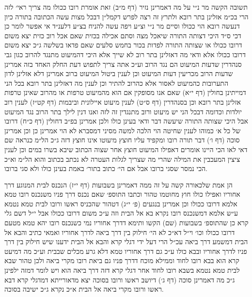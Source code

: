 \documentclass[12pt, openany]{book}
\begin{document}
\begin{multicols}{2}
תשובה הקשה מר נ״י על מה דאמרינן נזיר (דף מ״ב) זאת אומרת רובו ככולו מה צריך ראי׳ לזה הרי בכ״מ אזלינן בתר רובא ולתרץ זה רצה לפרש דקמל״ן דבכל מצות עשה הכתובה בתורה כיון דנעשה רובא הוי ככולו וסיים מר נ״י וצ״ע ויפה עשה להניח בצ״ע דלענ״ד אי אפשר לומר כן דכי ס״ד היכי דצותה התורה שיאכל מצה וסתם אכילה בכזית שאם אכל רוב כזית יצא משום דרובו ככולו או שצותה התורה לפדות בכור בחמש סלעים שאם פדאו בשלשה ג״כ יצא משום דרובו ככולו אלא ודאי מה דאזלינן בתר רוב לא שייך אלא היכי דהמיעוט מתנגד להרוב כגון גבי סנהדרין שדעות המיעוט הם נגד הרוב וע״כ אתה צריך לתפוש דעת החלק האחד בזה אמרינן שדעות הרוב מכריעין דעות המיעוט וכן לענין ביטול המיעוט ברוב אמרינן דלא אזלינן לדון התערובות כהמיעוט לאסור אלא כהרוב להתיר וכן לענין מה דאזלינן בתר רובא בכל הני דמייתינן בחולין (דף י״א) שאם אנו מסופקין אם הוא מהמיעוט טרפות או מהרוב שאינן טרפות אזלינן בתר רובא וכן בסנהדרין (דף ס״ט) לענין מיעוט איילונית וביבמות (דף קט״ז) לענין רוב יולדות וכדומה דבכל הני יש מיעוט ורוב מתנגדין זה לזה ואנו דנין לילך בתר הרוב נגד המיעוט אבל היכי שצותה התורה שיעשה דבר ודאי בעינן כולו ולכן אמרינן בפ״ב דחולין (דף כ״ח) דרובו של כל א׳ כמוהו לענין שחיטה הוי הלכה למשה מסיני דמסברא לא הוי אמרינן כן וכן אמרינן סוכה (דף ו׳) דבר תורה רובו ומקפיד עליו חוצץ מיעוטו אינו חוצץ דזה ג״כ הל״מ כנראה שם דאי לאו הכי היינו אומרים דאפילו המיעוט חוצץ אחר שצוה הכתוב שיבא בשרו במים וכן לענין ציצין המעכבין את המילה שהרי מה שצריך לגלות העטרה לא נכתב בכתוב והוא הל״מ וא״כ הכי נמסר שסגי ברובו אבל אם הי׳ כתוב בתור׳ באמת בעינן כולו ולא סגי ברובו.\\\vspace{0pt}

הן אמת שלכאורה קשה על זה ממה דאמרינן בשבועות (דף י״ז) הנכנס לבית המנוגע דרך אחוריו ואפילו כולו חוץ מחוטמו טהור וכתבו התוספ׳ שאם נכנס דרך פניו משנכנס רובו טמא אלמא דרובו ככולו וכן אמרינן בנגעים (פ׳ י״ג) דטהור שהכניס ראשו ורובו לבית טמא נטמא ע״ש אלמא דמשנכנס רובו נקרא בא אל הבית וזה ע״כ משום דרובו ככולו אבל י״ל דשם גלי קרא כן שהתוספ׳ בשבועות (שם) הקשו ותימא דדרך אחוריו נמי כשנכנס רובו יהא טמא מטעם דרובו ככולו וכו׳ וי״ל דא״כ לא הי׳ חילוק בין דרך ביאה לדרך אחוריו ואמאי כתיב והבא אל הבית דמשמע דרך ביאה עכ״ל הרי דעל ידי דגלי קרא והבא אל הבית ידענו שיש חילוק בין דרך פניו לדרך אחוריו ובבא כולו ע״כ גם דרך אחוריו טמא דלא גרע מכלים שבבית וע״כ מה דמיעט קרא הוא בבא רובו לחוד וממילא מוכח דדרך פניו גם ביאת רובו מקרי ביאה ולכן טהור שבא לבית טמא נטמא בשבא רובו לחוד אחר דגלי קרא דזה דרך ביאה הוא ויש לומר דמזה ילפינן ג״כ מה דאמרינן סוכה (דף ג׳) דיושב ראשו ורובו בסוכה יצא מדאורייתא דמדגלי קרא דבא ראשו ורובו מקרי ביאה אל הבית א״כ נקרא ג״כ ישיבה בסוכה.\\\vspace{0pt}


\end{multicols}
\end{document}

